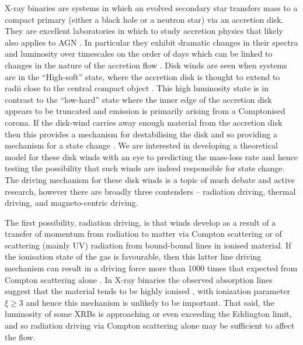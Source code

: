 \documentclass[a4paper,fleqn,usenatbib]{mnras}
\begin{document}
X-ray binaries are systems in 
which an evolved secondary star transfers mass to a compact primary (either a black hole or a neutron star)
via an accretion disk. They are excellent laboratories in which to study accretion physics that likely also applies to AGN
\citep{2003MNRAS.345L..19M,2004A&A...414..895F,2006MNRAS.372.1366K}.
In particular they exhibit dramatic changes in their spectra and luminosity over timescales on the order of days
\cite[e.g.][]{1999ApJ...520..776S,2004ApJ...610..378P} which can be linked to changes in the nature of the accretion flow \cite[e.g.][]{1995PASP..107.1207N,2012Sci...337..540F}. Disk winds are seen when 
systems are in the ``High-soft'' state, where the accretion disk is thought to extend to radii close to the 
central compact object \cite[][although also see \citealt{2016ApJ...830L...5H}]{2012MNRAS.422L..11P}. This high luminosity state is in contrast to the ``low-hard'' state
where the inner edge of the accretion disk appears to be truncated and emission is primarily arising from a Comptonised
corona. If the disk-wind carries away enough material from the accretion disk then this provides a mechanism for
destabilising the disk and so providing a mechanism for a state change \citep{1986ApJ...306...90S}. We are
interested in developing a theoretical model for these disk winds with an eye to predicting the mass-loss rate
and hence testing the possibility that such winds are indeed responsible for state change. 
The driving mechanism for these disk winds is a topic of much debate and active research, however there are broadly
three contenders -- radiation driving, thermal driving, and magneto-centric driving. 

The first possibility, radiation driving, is that winds develop as a result of 
 a transfer of momentum from radiation to matter via Compton
scattering or of scattering (mainly UV) radiation
from bound-bound lines in ionised material. If the ionisation state of the gas is 
favourable, then this latter line driving mechanism can
result in a driving force more than  1000 times that expected from Compton scattering alone \citep{1975ApJ...195..157C}.
 In X-ray binaries
the observed absorption lines suggest that the material tends to be highly ionised \citep[e.g.][]{2009ApJ...701..865K,
2018ApJ...861...26A}, with ionization parameter $\xi \geq 3$
\citep{2016AN....337..368D} and hence this mechanism is unlikely to be important. That said, the luminosity of 
some XRBs is 
approaching or even exceeding the Eddington limit, and so radiation driving via Compton scattering alone 
may be sufficient to affect the
flow.
\end{document}
